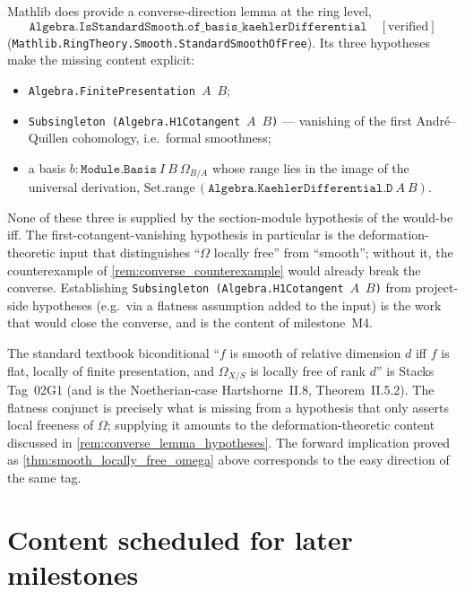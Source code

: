 \begin{remark}
  \label{rem:converse_lemma_hypotheses}
  Mathlib does provide a converse-direction lemma at the ring level,
  \[
    \texttt{Algebra.IsStandardSmooth.of\_basis\_kaehlerDifferential} \quad [\text{verified}]
  \]
  (\texttt{Mathlib.RingTheory.Smooth.StandardSmoothOfFree}). Its three hypotheses make the missing content explicit:
  \begin{itemize}
    \item \texttt{Algebra.FinitePresentation}~\(A\)~\(B\);
    \item \texttt{Subsingleton (Algebra.H1Cotangent}~\(A\)~\(B\)\texttt{)} --- vanishing of the first Andr\'e--Quillen cohomology, i.e.\ formal smoothness;
    \item a basis \(b \colon \texttt{Module.Basis}~I~B~\Omega_{B/A}\) whose range lies in the image of the universal derivation, \(\mathrm{Set.range}\,(\texttt{Algebra.KaehlerDifferential.D}~A~B)\).
  \end{itemize}
  None of these three is supplied by the section-module hypothesis of the would-be iff. The first-cotangent-vanishing hypothesis in particular is the deformation-theoretic input that distinguishes ``\(\Omega\) locally free'' from ``smooth''; without it, the counterexample of \cref{rem:converse_counterexample} would already break the converse. Establishing \texttt{Subsingleton (Algebra.H1Cotangent}~\(A\)~\(B\)\texttt{)} from project-side hypotheses (e.g.\ via a flatness assumption added to the input) is the work that would close the converse, and is the content of milestone~M4.
\end{remark}

\begin{remark}
  \label{rem:stacks_02G1}
  The standard textbook biconditional ``\(f\) is smooth of relative dimension \(d\) iff \(f\) is flat, locally of finite presentation, and \(\Omega_{X/S}\) is locally free of rank \(d\)'' is Stacks Tag~02G1 (and is the Noetherian-case Hartshorne~II.8, Theorem~II.5.2). The flatness conjunct is precisely what is missing from a hypothesis that only asserts local freeness of \(\Omega\); supplying it amounts to the deformation-theoretic content discussed in \cref{rem:converse_lemma_hypotheses}. The forward implication proved as \cref{thm:smooth_locally_free_omega} above corresponds to the easy direction of the same tag.
\end{remark}

\section{Content scheduled for later milestones}

